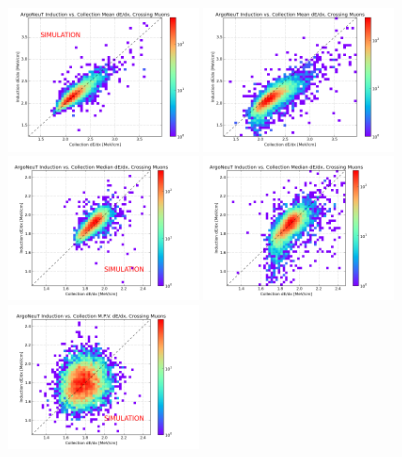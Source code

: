 \begin{figure}[p]
  \centering
  \includegraphics[width=0.45\textwidth]{lartpc_figures/mean_coll_vs_ind_sim_muons.png}
  \includegraphics[width=0.45\textwidth]{lartpc_figures/mean_coll_vs_ind_data.png}
  \includegraphics[width=0.45\textwidth]{lartpc_figures/median_coll_vs_ind_sim_muons.png}
  \includegraphics[width=0.45\textwidth]{lartpc_figures/median_coll_vs_ind_data.png}
  \includegraphics[width=0.45\textwidth]{lartpc_figures/mpv_coll_vs_ind_sim_muons.png}

\end{figure}
